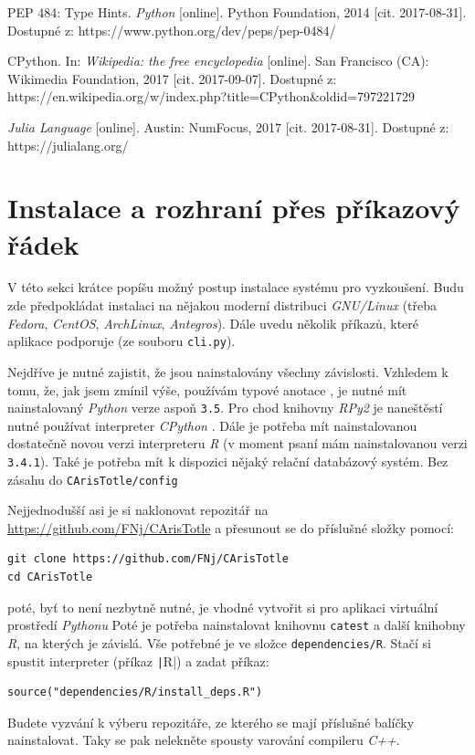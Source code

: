 \documentclass[a4paper,twoside,12pt]{scrbook}
\begin{document}
\begin{thebibliography}{99}
	 PEP 484: Type Hints. \textit{Python} [online]. Python Foundation, 2014 [cit. 2017-08-31]. Dostupné z: https://www.python.org/dev/peps/pep-0484/

	 CPython. In: \textit{Wikipedia: the free encyclopedia} [online]. San Francisco (CA): Wikimedia Foundation, 2017 [cit. 2017-09-07]. Dostupné z: https://en.wikipedia.org/w/index.php?title=CPython\&oldid=797221729

	 \textit{Julia Language} [online]. Austin: NumFocus, 2017 [cit. 2017-08-31]. Dostupné z: https://julialang.org/

\end{thebibliography}


\newpage %
\appendix %



\section*{Instalace a rozhraní přes příkazový řádek}
\label{appendix:installation}

V této sekci krátce popíšu možný postup instalace systému pro vyzkoušení. Budu zde předpokládat instalaci na nějakou moderní distribuci \textit{GNU/Linux} (třeba \textit{Fedora}, \textit{CentOS}, \textit{ArchLinux}, \textit{Antegros}). Dále uvedu několik příkazů, které aplikace podporuje (ze souboru \texttt{cli.py}).

Nejdříve je nutné zajistit, že jsou nainstalovány všechny závislosti. Vzhledem k tomu, že, jak jsem zmínil výše, používám typové anotace \cite{PEP484}, je nutné mít nainstalovaný \textit{Python} verze aspoň \texttt{3.5}. Pro chod knihovny \textit{RPy2} je naneštěstí nutné používat interpreter \textit{CPython} \cite{CPython}. Dále je potřeba mít nainstalovanou dostatečně novou verzi interpreteru \textit{R} (v moment psaní mám nainstalovanou verzi \texttt{3.4.1}). Také je potřeba mít k dispozici nějaký relační databázový systém. Bez zásahu do \texttt{CArisTotle/config}

Nejjednodušší asi je si naklonovat repozitář na \url{https://github.com/FNj/CArisTotle} a přesunout se do příslušné složky pomocí:
\begin{verbatim}
git clone https://github.com/FNj/CArisTotle
cd CArisTotle
\end{verbatim}
poté, byť to není nezbytně nutné, je vhodné vytvořit si pro aplikaci virtuální prostředí \textit{Pythonu}
Poté je potřeba nainstalovat knihovnu \texttt{catest} a další knihobny \textit{R}, na kterých je závislá. Vše potřebné je ve složce \texttt{dependencies/R}. Stačí si spustit interpreter (příkaz \texttt|R|) a zadat příkaz:
\begin{verbatim}
source("dependencies/R/install_deps.R")
\end{verbatim}
Budete vyzvání k výberu repozitáře, ze kterého se mají příslušné balíčky nainstalovat. Taky se pak nelekněte spousty varování compileru \textit{C++}.
\end{document}
